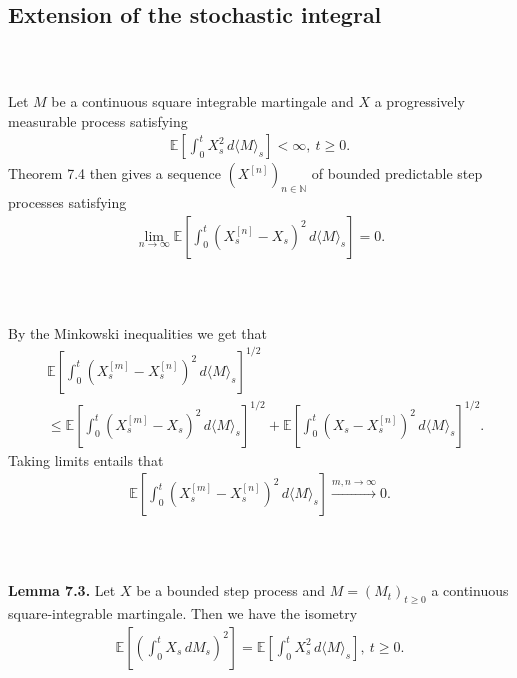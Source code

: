 \documentclass{beamer}
\numberwithin{equation}{section}
\newenvironment{frame2}{\begin{frame}\frametitle{{\normalsize \secname} \\ {\large \subsecname}}}{\end{frame}}
\begin{document}
\subsection{Extension of the stochastic integral}

\begin{frame2}
    Let $M$ be a continuous square integrable martingale and $X$ a progressively measurable process satisfying
    \begin{align*}
        \mathbb{E}\left[\int_0^t X_s^2 \, d \langle M \rangle_s \right] < \infty, \ t \geq 0.
    \end{align*}
    Theorem 7.4 then gives a sequence $(X^{[n]})_{n\in \mathbb{N}}$ of bounded predictable step processes satisfying
    \begin{align*}
        \lim_{n \to \infty} \mathbb{E}\left[\int_0^t (X_s^{[n]} - X_s)^2 \, d\langle M \rangle_s\right] = 0.
    \end{align*}
\end{frame2}

\begin{frame2}
    By the Minkowski inequalities we get that
    \begin{align*}
        &\mathbb{E}\left[\int_0^t (X_s^{[m]} - X^{[n]}_s)^2 \, d\langle M \rangle_s\right]^{1/2} \\
        &\leq \mathbb{E}\left[\int_0^t (X_s^{[m]} - X_s)^2 \, d\langle M \rangle_s\right]^{1/2}  + \mathbb{E}\left[\int_0^t (X_s - X_s^{[n]})^2 \, d\langle M \rangle_s\right]^{1/2}.
    \end{align*}
    Taking limits entails that
    \begin{align}
        \mathbb{E}\left[\int_0^t (X_s^{[m]} - X^{[n]}_s)^2 \, d\langle M \rangle_s\right] \xrightarrow{m,n\to \infty} 0.
    \end{align}
\end{frame2}

\begin{frame2}
    \textbf{Lemma 7.3.}
    Let $X$ be a bounded step process and $M = (M_t)_{t \geq 0}$ a continuous square-integrable martingale.
    Then we have the isometry
    \begin{align}
        \mathbb{E}\left[\left(\int_0^t X_s \, d M_s\right)^2\right] = \mathbb{E}\left[\int_0^t X_s^2 \, d\langle M \rangle_s\right], \ t \geq 0.
    \end{align}
\end{frame2}
\end{document}
